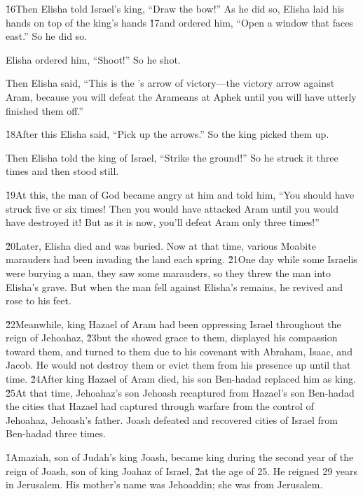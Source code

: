\v{16}Then Elisha told Israel's king, ``Draw the bow!'' As he did so, Elisha laid his hands on top of the king's hands \v{17}and ordered him, ``Open a window that faces east.'' So he did so.

Elisha ordered him, ``Shoot!'' So he shot.

Then Elisha said, ``This is the 's arrow of victory---the victory arrow against Aram, because you will defeat the Arameans at Aphek until you will have utterly finished them off.''

\v{18}After this Elisha said, ``Pick up the arrows.'' So the king picked them up.

Then Elisha told the king of Israel, ``Strike the ground!'' So he struck it three times and then stood still.

\v{19}At this, the man of God became angry at him and told him, ``You should have struck five or six times! Then you would have attacked Aram until you would have destroyed it! But as it is now, you'll defeat Aram only three times!''

\v{20}Later, Elisha died and was buried. Now at that time, various Moabite marauders had been invading the land each spring. \v{21}One day while some Israelis were burying a man, they saw some marauders, so they threw the man into Elisha's grave. But when the man fell against Elisha's remains, he revived and rose to his feet.

\v{22}Meanwhile, king Hazael of Aram had been oppressing Israel throughout the reign of Jehoahaz, \v{23}but the  showed grace to them, displayed his compassion toward them, and turned to them due to his covenant with Abraham, Isaac, and Jacob. He would not destroy them or evict them from his presence up until that time. \v{24}After king Hazael of Aram died, his son Ben-hadad replaced him as king. \v{25}At that time, Jehoahaz's son Jehoash recaptured from Hazael's son Ben-hadad the cities that Hazael had captured through warfare from the control of Jehoahaz, Jehoash's father. Joash defeated and recovered cities of Israel from Ben-hadad three times.

\v{1}Amaziah, son of Judah's king Joash, became king during the second year of the reign of Joash, son of king Joahaz of Israel, \v{2}at the age of 25. He reigned 29 years in Jerusalem. His mother's name was Jehoaddin; she was from Jerusalem.

